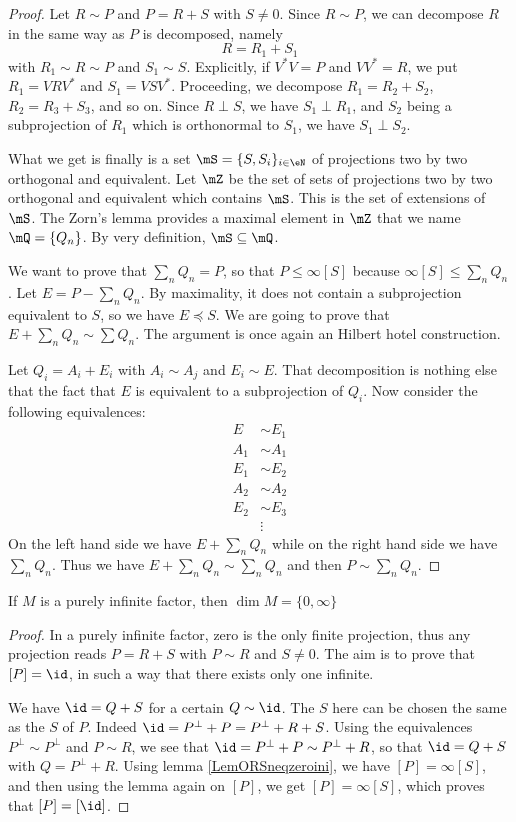 \begin{proof}
Let $R\sim P$ and $P=R+S$ with $S\neq 0$. Since $R\sim P$, we can decompose $R$ in the same way as $P$ is decomposed, namely
\[ 
	R=R_1+S_1
\]
with $R_1\sim R\sim P$ and $S_1\sim S$. Explicitly, if $V^*V=P$ and $VV^*=R$, we put $R_1=VRV^*$ and $S_1=VSV^*$. Proceeding, we decompose $R_1=R_2+S_2$, $R_2=R_3+S_3$, and so on. Since $R\perp S$, we have $S_1\perp R_1$, and $S_2$ being a subprojection of $R_1$ which is orthonormal to $S_1$, we have $S_1\perp S_2$.

What we get is finally is a set $\mS=\{ S,S_i \}_{i\in \eN}$ of projections two by two orthogonal and equivalent. Let $\mZ$ be the set of sets of projections two by two orthogonal and equivalent which contains $\mS$. This is the set of extensions of $\mS$. The Zorn's lemma provides a maximal element in $\mZ$ that we name $\mQ=\{ Q_n \}$. By very definition, $\mS\subseteq\mQ$.

We want to prove that $\sum_nQ_n=P$, so that $P\leq\infty[S]$ because $\infty[S]\leq\sum_nQ_n$. Let $E=P-\sum_nQ_n$. By maximality, it does not contain a subprojection equivalent to $S$, so we have $E\preceq S$. We are going to prove that $E+\sum_nQ_n\sim \sum Q_n$. The argument is once again an Hilbert hotel construction.

Let $Q_i=A_i+E_i$ with $A_i\sim A_j$ and $E_i\sim E$. That decomposition is nothing else that the fact that $E$ is equivalent to a subprojection of $Q_i$. Now consider the following equivalences:
\begin{align*}
	E&\sim E_1\\
	A_1&\sim A_1\\
	E_1&\sim E_2\\
	A_2&\sim A_2\\
	E_2&\sim E_3\\
	&\vdots
\end{align*}
On the left hand side we have $E+\sum_n Q_n$ while on the right hand side we have $\sum_nQ_n$. Thus we have $E+\sum_nQ_n\sim\sum_nQ_n$ and then $P\sim\sum_nQ_n$.
\end{proof}

\begin{corollary}
If $M$ is a purely infinite factor, then $\dim M=\{ 0,\infty \}$
\end{corollary}

\begin{proof}
In a purely infinite factor, zero is the only finite projection, thus any projection reads $P=R+S$ with $P\sim R$ and $S\neq 0$. The aim is to prove that $[P]=\id$, in such a way that there exists only one infinite.

We have $\id=Q+S$ for a certain $Q\sim \id$. The $S$ here can be chosen the same as the $S$ of $P$. Indeed $\id=P^{\perp}+P=P^{\perp}+R+S$. Using the equivalences $P^{\perp}\sim P^{\perp}$ and $P\sim R$, we see that $\id=P^{\perp}+P\sim P^{\perp}+R$, so that $\id=Q+S$ with $Q=P^{\perp}+R$. Using lemma \ref{LemORSneqzeroini}, we have $[P]=\infty[S]$, and then using the lemma again on $[P]$, we get $[P]=\infty[S]$, which proves that $[P]=[\id]$.
\end{proof}

